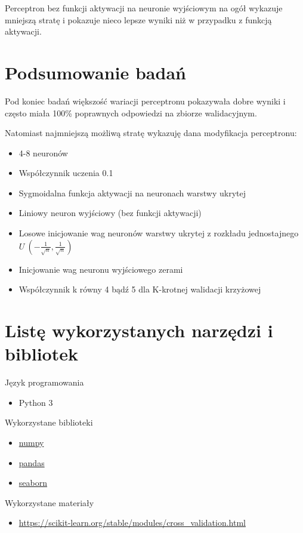 \documentclass[12pt,a4paper]{article}
\begin{document}
Perceptron bez funkcji aktywacji na neuronie wyjściowym na ogół wykazuje mniejszą stratę i pokazuje nieco lepsze wyniki niż w przypadku z funkcją aktywacji.

\section{Podsumowanie badań}

Pod koniec badań większość wariacji perceptronu pokazywała dobre wyniki i często miała 100\% poprawnych odpowiedzi na zbiorze walidacyjnym.

Natomiast najmniejszą możliwą stratę wykazuję dana modyfikacja perceptronu:

\begin{itemize}
  \item   4-8 neuronów
  \item   Współczynnik uczenia 0.1
  \item   Sygmoidalna funkcja aktywacji na neuronach warstwy ukrytej
  \item   Liniowy neuron wyjściowy (bez funkcji aktywacji)
  \item   Losowe inicjowanie wag neuronów warstwy ukrytej z rozkładu jednostajnego \(U ~ (-\frac{1}{\sqrt{n}}, \frac{1}{\sqrt{n}})\)
  \item   Inicjowanie wag neuronu wyjściowego zerami
  \item   Współczynnik k równy 4 bądź 5 dla K-krotnej walidacji krzyżowej
\end{itemize}

\section{Listę wykorzystanych narzędzi i bibliotek}

Język programowania

\begin{itemize}
	\item   Python 3
\end{itemize}

Wykorzystane biblioteki

\begin{itemize}
	\item   \href{https://numpy.org/}{numpy}
	\item   \href{https://pandas.pydata.org/}{pandas}
	\item   \href{https://seaborn.pydata.org/}{seaborn}
\end{itemize}

Wykorzystane materiały

\begin{itemize}
	\item   \url{https://scikit-learn.org/stable/modules/cross_validation.html}
\end{itemize}
\end{document}

